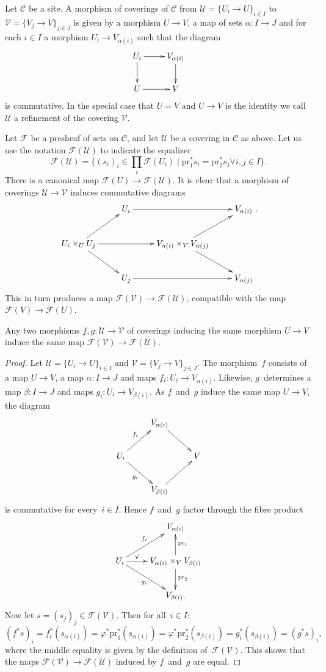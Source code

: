 \noindent
Let $\mathcal{C}$ be a site. A morphism of coverings of $\mathcal{C}$ from 
$\mathcal{U}=\{U_i \to U\}_{i\in I}$ to $\mathcal{V}=\{V_j \to V\}_{j\in J}$
is given by a morphism $U \to V$, a map of sets $\alpha : I \to J$ and
for each $i\in I$ a morphism $U_i \to V_{\alpha(i)}$ such that
the diagram
$$
\xymatrix{
U_i \ar[r] \ar[d] & V_{\alpha(i)} \ar[d] \\
U \ar[r] & V
}
$$
is commutative. In the special case that $U=V$ and $U\to V$ is the identity
we call $\mathcal{U}$ a refinement of the covering $\mathcal{V}$.

\smallskip\noindent
Let $\mathcal{F}$ be a presheaf of sets on $\mathcal{C}$, and let
$\mathcal{U}$ be a covering in $\mathcal{C}$ as above. Let us use the
notation $\mathcal{F}(\mathcal{U})$ to indicate the equalizer
$$
\mathcal{F}(\mathcal{U}) = \{ (s_i)_i \in \prod_i \mathcal{F}(U_i)
\mid  \text{pr}_1^\ast s_i = \text{pr}_2^\ast s_j \forall i,j \in I\}.
$$
There is a canonical map $\mathcal{F}(U) \to \mathcal{F}(\mathcal{U})$.
It is clear that a morphism of coverings $\mathcal{U} \to \mathcal{V}$
induces commutative diagrams
$$
\xymatrix{
& U_i \ar[rr] & & V_{\alpha(i)} \\
U_i \times_U U_j \ar[rr] \ar[ur] \ar[dr] & & 
V_{\alpha(i)}\times_V V_{\alpha(j)} \ar[ur] \ar[dr] & \\
& U_j \ar[rr] & & V_{\alpha(j)}
}.
$$
This in turn produces a map $\mathcal{F}(\mathcal{V}) \to 
\mathcal{F}(\mathcal{U})$, compatible with the map $\mathcal{F}(V) 
\to \mathcal{F}(U)$. 

\begin{lemma}
\label{lemma-indepent-refinement}
Any two morphisms $f,g: \mathcal{U} \to \mathcal{V}$ of coverings
inducing the same morphism $U \to V$ induce the same
map $\mathcal{F}(\mathcal{V}) \to \mathcal{F}(\mathcal{U})$.
\end{lemma}

\begin{proof}
Let $\mathcal{U}=\{U_i \to U\}_{i\in I}$ and 
$\mathcal{V}=\{V_j \to V\}_{j\in J}$.
The morphism~$f$ consists of a map $U\to V$, a map $\alpha\colon I\to J$ and
maps $f_i\colon U_i\to V_{\alpha(i)}$.
Likewise, $g$~determines a map $\beta\colon I\to J$ and maps
$g_i\colon U_i\to V_{\beta(i)}$.
As $f$~and~$g$ induce the same map $U\to V$, the diagram
$$\xymatrix{&V_{\alpha(i)}\ar[dr]\\
  U_i\ar[ur]^{f_i}\ar[dr]_{g_i}&&V\\
  &V_{\beta(i)}\ar[ur]}$$
is commutative for every~$i\in I$. Hence $f$~and~$g$ factor through 
the fibre product
$$\xymatrix{&V_{\alpha(i)}\\
  U_i\ar[r]^-\varphi\ar[ur]^{f_i}\ar[dr]_{g_i}&
  V_{\alpha(i)}\times_VV_{\beta(i)}\ar[u]_{\text{pr}_1}\ar[d]^{\text{pr}_2}\\
  &V_{\beta(i)}.}$$
Now let $s=(s_j)_j\in\mathcal{F}(\mathcal{V})$.
Then for all~$i\in I$:
 $$(f^*s)_i=f_i^*(s_{\alpha(i)})=\varphi^*\text{pr}_1^*(s_{\alpha(i)})
   =\varphi^*\text{pr}_2^*(s_{\beta(i)})=g_i^*(s_{\beta(i)})=(g^*s)_i,$$
where the middle equality is given by the definition 
of~$\mathcal{F}(\mathcal{V})$.
This shows that the maps $\mathcal{F}(\mathcal{V})\to\mathcal{F}(\mathcal{U})$
induced by $f$~and~$g$ are equal.
\end{proof}

